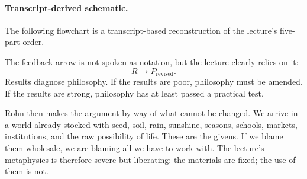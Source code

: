 \paragraph{Transcript-derived schematic.} The following flowchart is a transcript-based reconstruction of the lecture's five-part order.

\begin{figure}
\begin{center}
\end{center}
\end{figure}

The feedback arrow is not spoken as notation, but the lecture clearly relies on it:
\begin{equation}
R \to P_{\text{revised}}.
\end{equation}
Results diagnose philosophy. If the results are poor, philosophy must be amended. If the results are strong, philosophy has at least passed a practical test.

Rohn then makes the argument by way of what cannot be changed. We arrive in a world already stocked with seed, soil, rain, sunshine, seasons, schools, markets, institutions, and the raw possibility of life. These are the givens. If we blame them wholesale, we are blaming all we have to work with. The lecture's metaphysics is therefore severe but liberating: the materials are fixed; the use of them is not.


